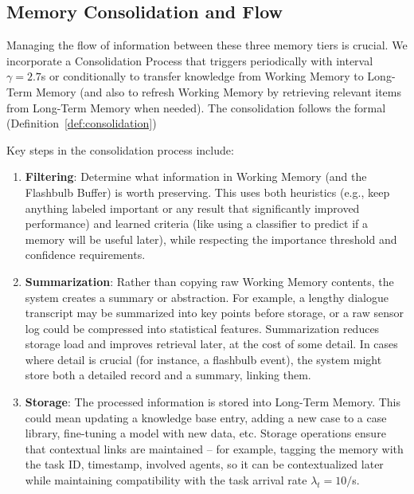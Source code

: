 \documentclass{article}
\begin{document}
\subsection{Memory Consolidation and Flow}

Managing the flow of information between these three memory tiers is crucial. We incorporate a Consolidation Process that triggers periodically with interval $\gamma = 2.7$s or conditionally to transfer knowledge from Working Memory to Long-Term Memory (and also to refresh Working Memory by retrieving relevant items from Long-Term Memory when needed). The consolidation follows the formal (Definition~\ref{def:consolidation})

Key steps in the consolidation process include:
\begin{enumerate}
\item \textbf{Filtering}: Determine what information in Working Memory (and the Flashbulb Buffer) is worth preserving. This uses both heuristics (e.g., keep anything labeled important or any result that significantly improved performance) and learned criteria (like using a classifier to predict if a memory will be useful later), while respecting the importance threshold and confidence requirements.

\item \textbf{Summarization}: Rather than copying raw Working Memory contents, the system creates a summary or abstraction. For example, a lengthy dialogue transcript may be summarized into key points before storage, or a raw sensor log could be compressed into statistical features. Summarization reduces storage load and improves retrieval later, at the cost of some detail. In cases where detail is crucial (for instance, a flashbulb event), the system might store both a detailed record and a summary, linking them.

\item \textbf{Storage}: The processed information is stored into Long-Term Memory. This could mean updating a knowledge base entry, adding a new case to a case library, fine-tuning a model with new data, etc. Storage operations ensure that contextual links are maintained – for example, tagging the memory with the task ID, timestamp, involved agents, so it can be contextualized later while maintaining compatibility with the task arrival rate $\lambda_t = 10/$s.
\end{enumerate}
\end{document}
